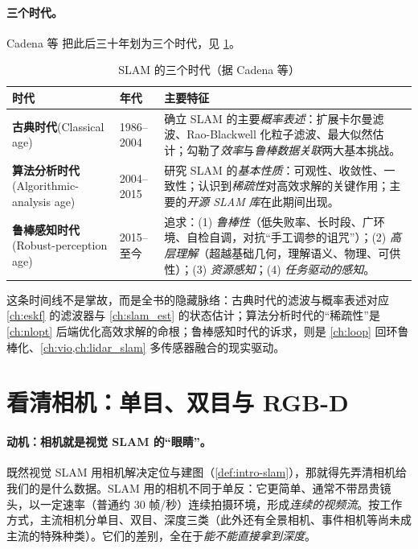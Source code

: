 \paragraph{三个时代。}
Cadena 等\cite{cadena2016past} 把此后三十年划为三个时代，见 \cref{tab:intro-eras}。

\begin{table}[H]\centering\small
\caption{SLAM 的三个时代（据 Cadena 等\cite{cadena2016past}）}
\label{tab:intro-eras}
\begin{tabular}{p{} p{} p{}}
\toprule
时代 & 年代 & 主要特征 \\
\midrule
\textbf{古典时代}\newline(Classical age) & 1986--2004 & 确立 SLAM 的主要\emph{概率表述}：扩展卡尔曼滤波、Rao-Blackwell 化粒子滤波、最大似然估计；勾勒了\emph{效率}与\emph{鲁棒数据关联}两大基本挑战。 \\
\textbf{算法分析时代}\newline(Algorithmic-analysis age) & 2004--2015 & 研究 SLAM 的\emph{基本性质}：可观性、收敛性、一致性；认识到\emph{稀疏性}对高效求解的关键作用；主要的\emph{开源 SLAM 库}在此期间出现。 \\
\textbf{鲁棒感知时代}\newline(Robust-perception age) & 2015--至今 & 追求：(1) \emph{鲁棒性}（低失败率、长时段、广环境、自检自调，对抗“手工调参的诅咒”）；(2) \emph{高层理解}（超越基础几何，理解语义、物理、可供性）；(3) \emph{资源感知}；(4) \emph{任务驱动的感知}。 \\
\bottomrule
\end{tabular}
\end{table}

\noindent 这条时间线不是掌故，而是全书的隐藏脉络：古典时代的滤波与概率表述对应 \cref{ch:eskf} 的滤波器与 \cref{ch:slam_est} 的状态估计；算法分析时代的“稀疏性”是 \cref{ch:nlopt} 后端优化高效求解的命根；鲁棒感知时代的诉求，则是 \cref{ch:loop} 回环鲁棒化、\cref{ch:vio,ch:lidar_slam} 多传感器融合的现实驱动。

\section{看清相机：单目、双目与 RGB-D}
\label{sec:intro-camera}

\paragraph{动机：相机就是视觉 SLAM 的“眼睛”。}
既然视觉 SLAM 用相机解决定位与建图（\cref{def:intro-slam}），那就得先弄清相机给我们的是什么数据。SLAM 用的相机不同于单反：它更简单、通常不带昂贵镜头，以一定速率（普通约 $30$ 帧/秒）连续拍摄环境，形成\emph{连续的视频流}\cite{gaoxiang2019slam14}。按工作方式，主流相机分单目、双目、深度三类（此外还有全景相机、事件相机等尚未成主流的特殊种类）。它们的差别，全在于\emph{能不能直接拿到深度}。

